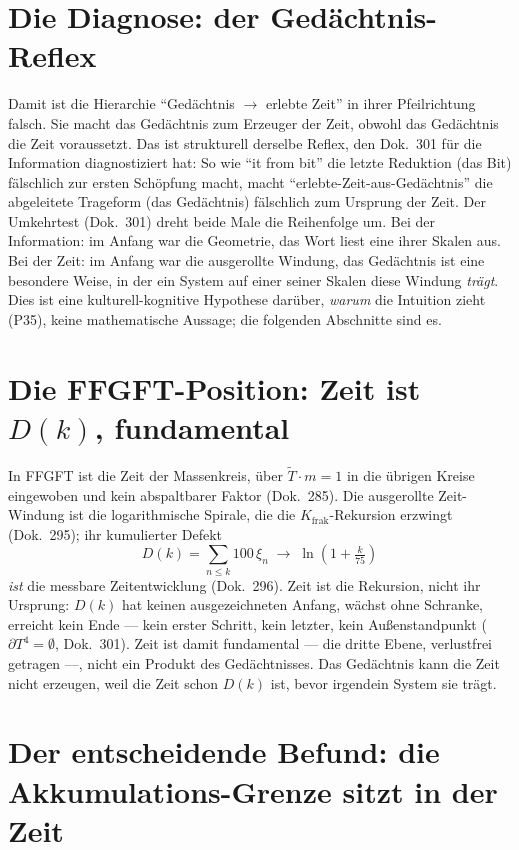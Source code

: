 \section{Die Diagnose: der Gedächtnis-Reflex}

Damit ist die Hierarchie \enquote{Gedächtnis $\to$ erlebte Zeit} in ihrer Pfeilrichtung
falsch. Sie macht das Gedächtnis zum Erzeuger der Zeit, obwohl das Gedächtnis die Zeit
voraussetzt. Das ist strukturell derselbe Reflex, den Dok.~301 für die Information
diagnostiziert hat: So wie \enquote{it from bit} die letzte Reduktion (das Bit)
fälschlich zur ersten Schöpfung macht, macht \enquote{erlebte-Zeit-aus-Gedächtnis} die
abgeleitete Trageform (das Gedächtnis) fälschlich zum Ursprung der Zeit. Der Umkehrtest
(Dok.~301) dreht beide Male die Reihenfolge um. Bei der Information: im Anfang war die
Geometrie, das Wort liest eine ihrer Skalen aus. Bei der Zeit: im Anfang war die
ausgerollte Windung, das Gedächtnis ist eine besondere Weise, in der ein System auf einer
seiner Skalen diese Windung \emph{trägt}. Dies ist eine kulturell-kognitive Hypothese
darüber, \emph{warum} die Intuition zieht (P35), keine mathematische Aussage; die
folgenden Abschnitte sind es.

\section{Die FFGFT-Position: Zeit ist $D(k)$, fundamental}

In FFGFT ist die Zeit der Massenkreis, über $\tilde{T}\cdot m = 1$ in die übrigen Kreise
eingewoben und kein abspaltbarer Faktor (Dok.~285). Die ausgerollte Zeit-Windung ist die
logarithmische Spirale, die die $K_{\text{frak}}$-Rekursion erzwingt (Dok.~295); ihr
kumulierter Defekt
\begin{equation}
D(k) = \sum_{n\le k} 100\,\xi_n \;\to\; \ln\!\left(1 + \tfrac{k}{75}\right)
\end{equation}
\emph{ist} die messbare Zeitentwicklung (Dok.~296). Zeit ist die Rekursion, nicht ihr
Ursprung: $D(k)$ hat keinen ausgezeichneten Anfang, wächst ohne Schranke, erreicht kein
Ende --- kein erster Schritt, kein letzter, kein Außenstandpunkt ($\partial T^4 = \emptyset$,
Dok.~301). Zeit ist damit fundamental --- die dritte Ebene, verlustfrei getragen ---, nicht
ein Produkt des Gedächtnisses. Das Gedächtnis kann die Zeit nicht erzeugen, weil die Zeit
schon $D(k)$ ist, bevor irgendein System sie trägt.

\section{Der entscheidende Befund: die Akkumulations-Grenze sitzt in der Zeit}

